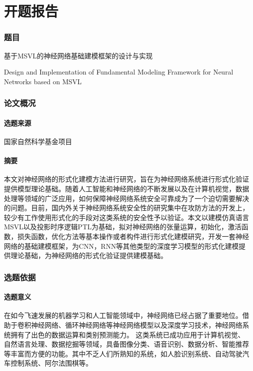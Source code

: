 \part{开题报告}

\section{题目}
基于MSVL的神经网络基础建模框架的设计与实现

Design and Implementation of Fundamental Modeling Framework for Neural Networks based on MSVL


\section{论文概况}
\subsection{选题来源}
国家自然科学基金项目

\subsection{摘要}

本文对神经网络的形式化建模方法进行研究，旨在为神经网络系统进行形式化验证提供模型理论基础。随着人工智能和神经网络的不断发展以及在计算机视觉，数据处理等领域的广泛应用，如何保障神经网络系统安全可靠成为了一个迫切需要解决的问题。目前，国内外关于神经网络系统安全性的研究集中在攻防方法的开发上，较少有工作使用形式化的手段对这类系统的安全性予以验证。本文以建模仿真语言MSVL以及投影时序逻辑PTL为基础，拟对神经网络的张量运算，初始化，激活函数，损失函数，优化方法等基本操作或者构件进行形式化建模研究，开发一套神经网络的基础建模框架，为CNN，RNN等其他类型的深度学习模型的形式化建模提供理论基础，为神经网络的形式化验证提供建模基础。

\section{选题依据}

\subsection{选题意义}

在如今飞速发展的机器学习和人工智能领域中，神经网络已经占据了重要地位。借助于卷积神经网络、循环神经网络等神经网络模型以及深度学习技术，神经网络系统拥有了出色的数据运算和类别预测能力。
这类系统已成功应用于计算机视觉、自然语言处理、数据挖掘等领域，具备图像分类、语音识别、数据分析、智能推荐等丰富而方便的功能。其中不乏人们所熟知的系统，如人脸识别系统、自动驾驶汽车控制系统、阿尔法围棋等。

